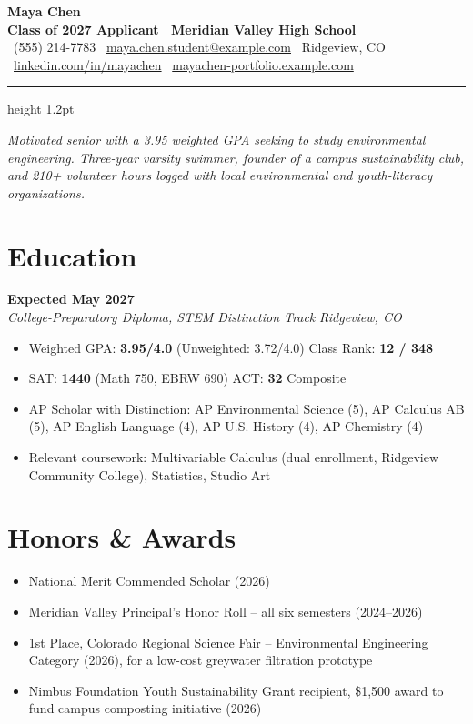 \documentclass[9.3pt,letterpaper]{article}
\newcommand{\entry}[4]{%
  \noindent{\bfseries\color{inkblue} #1} \hfill {\bfseries\color{accentgold} #2}\\
  {\itshape #3} \hfill {\itshape\color{softgray} #4}\\[0pt]
}
\newenvironment{tightlist}{%
  \begin{itemize}[leftmargin=13pt,itemsep=0pt,parsep=0pt,topsep=1pt,partopsep=0pt,label={\small\textbullet}]
}{%
  \end{itemize}
}
\begin{document}
\begin{center}
  {\fontsize{26}{28}\selectfont\bfseries\color{inkblue} Maya Chen}\\[3pt]
  {\color{accentgold}\bfseries\large Class of 2027 Applicant \textbar\ Meridian Valley High School}\\[5pt]
  {\small\color{softgray}
    \faPhone\ (555) 214-7783 \quad\textbar\quad
    \faEnvelope\ \href{mailto:maya.chen.student@example.com}{maya.chen.student@example.com} \quad\textbar\quad
    \faMapMarker\ Ridgeview, CO \quad\textbar\quad
    \faLinkedin\ \href{https://linkedin.com/in/example}{linkedin.com/in/mayachen} \quad\textbar\quad
    \faGlobe\ \href{https://example.com}{mayachen-portfolio.example.com}
  }
\end{center}
\vspace{-2pt}
{\color{rulegray}\hrule height 1.2pt}
\vspace{4pt}

{\small\color{softgray}\itshape
Motivated senior with a 3.95 weighted GPA seeking to study environmental engineering. Three-year
varsity swimmer, founder of a campus sustainability club, and 210+ volunteer hours logged with
local environmental and youth-literacy organizations.}

\section{Education}
\entry{Meridian Valley High School}{Expected May 2027}{College-Preparatory Diploma, STEM Distinction Track}{Ridgeview, CO}
\begin{tightlist}
  \item Weighted GPA: \textbf{3.95/4.0} (Unweighted: 3.72/4.0) \quad\textbar\quad Class Rank: \textbf{12 / 348}
  \item SAT: \textbf{1440} (Math 750, EBRW 690) \quad\textbar\quad ACT: \textbf{32} Composite
  \item AP Scholar with Distinction: AP Environmental Science (5), AP Calculus AB (5), AP English Language (4), AP U.S. History (4), AP Chemistry (4)
  \item Relevant coursework: Multivariable Calculus (dual enrollment, Ridgeview Community College), Statistics, Studio Art
\end{tightlist}

\section{Honors \& Awards}
\begin{tightlist}
  \item National Merit Commended Scholar (2026)
  \item Meridian Valley Principal's Honor Roll -- all six semesters (2024--2026)
  \item 1st Place, Colorado Regional Science Fair -- Environmental Engineering Category (2026), for a low-cost greywater filtration prototype
  \item Nimbus Foundation Youth Sustainability Grant recipient, \$1,500 award to fund campus composting initiative (2026)
\end{tightlist}
\end{document}
